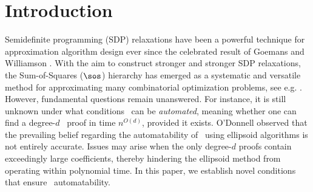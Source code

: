 \documentclass[11pt]{article}
\begin{document}
\section{Introduction}\label{sect:introduction}
Semidefinite programming (SDP) relaxations have been a powerful technique for approximation algorithm design ever since the celebrated result of Goemans and Williamson \cite{GoemansWilliamson1995}. With the aim to construct stronger and stronger SDP relaxations, the Sum-of-Squares ($\sos$) hierarchy has emerged as a systematic and versatile method for approximating many combinatorial optimization problems, see e.g. \cite{Lasserre2001, Parrilo03, FlemingKothariPitassi19, Laurent2009}.
However, fundamental questions remain unanswered. For instance, it is still unknown under what conditions \sos\ can be \emph{automated}, meaning whether one can find a degree-$d$ \sos\ proof in time $n^{O(d)}$, provided it exists.
%
O'Donnell \cite{odonnell2017} observed that the prevailing belief regarding the automatability of \sos\ using ellipsoid algorithms is not entirely accurate. Issues may arise when the only degree-$d$ proofs contain exceedingly large coefficients, thereby hindering the ellipsoid method from operating within polynomial time. 
In this paper, we establish novel conditions that ensure \sos\ automatability.
\end{document}
